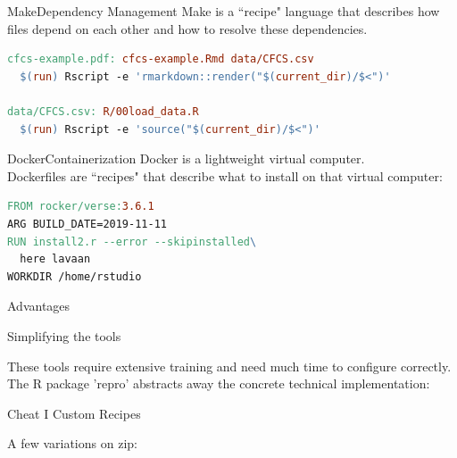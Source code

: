 \documentclass[12pt,t]{beamer}
\begin{document}
{\begin{frame}[c, fragile]{Make\textemdash{}Dependency Management}
Make is a ``recipe" language that describes how files depend on each other and how to resolve these dependencies.
\vspace{10mm}
\begin{lstlisting}[language=make,basicstyle=\ttfamily\scriptsize]
cfcs-example.pdf: cfcs-example.Rmd data/CFCS.csv
  $(run) Rscript -e 'rmarkdown::render("$(current_dir)/$<")'

data/CFCS.csv: R/00load_data.R
  $(run) Rscript -e 'source("$(current_dir)/$<")'
\end{lstlisting}
\end{frame}

\begin{frame}[c, fragile]{Docker\textemdash{}Containerization}
	Docker is a lightweight virtual computer.\\
	Dockerfiles are ``recipes" that describe what to install on that virtual computer:
	\vspace{10mm}
	\begin{lstlisting}[language=make,basicstyle=\ttfamily\scriptsize]
FROM rocker/verse:3.6.1
ARG BUILD_DATE=2019-11-11
RUN install2.r --error --skipinstalled\
  here lavaan
WORKDIR /home/rstudio
\end{lstlisting}
\end{frame}

\begin{frame}[c]{Advantages}
	\begin{center}
	\end{center}
\end{frame}

\begin{frame}[c]{Simplifying the tools}

\textcolor<2->{lolit}{These tools require extensive training and need much time to configure correctly.\\}
\onslide<2->\textcolor<3->{lolit}{The R package 'repro' abstracts away the concrete technical implementation:\\}
\onslide<3->{\centering \Huge Live Demo}

\end{frame}

\begin{frame}[fragile, c]{Cheat I \textemdash{} Custom Recipes}

A few variations on zip:


\end{frame}}
\end{document}
